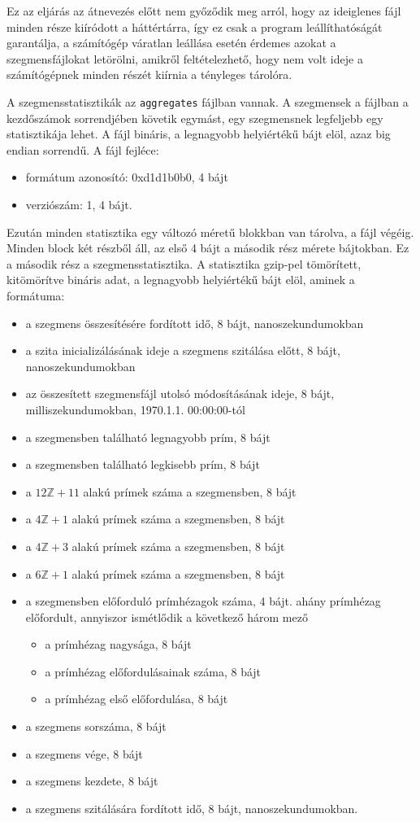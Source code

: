 Ez az eljárás az átnevezés előtt nem győződik meg arról, hogy az ideiglenes fájl minden része
kiíródott a háttértárra, így ez csak a program leállíthatóságát garantálja, a számítógép váratlan leállása esetén érdemes azokat a szegmensfájlokat letörölni, amikről feltételezhető, hogy nem volt ideje a számítógépnek minden részét kiírnia a tényleges tárolóra.

A szegmensstatisztikák az \texttt{aggregates} fájlban vannak.
A szegmensek a fájlban a kezdőszámok sorrendjében követik egymást, egy szegmensnek legfeljebb egy statisztikája lehet.
A fájl bináris, a legnagyobb helyiértékű bájt elöl, azaz big endian sorrendű. A fájl fejléce:
\begin{itemize}
\item formátum azonosító: 0xd1d1b0b0, 4 bájt
\item verziószám: 1, 4 bájt.
\end{itemize}
Ezután minden statisztika egy változó méretű blokkban van tárolva, a fájl végéig.
Minden block két részből áll, az első 4 bájt a második rész mérete bájtokban.
Ez a második rész a szegmensstatisztika.
A statisztika gzip-pel tömörített, kitömörítve bináris adat, a legnagyobb helyiértékű bájt elöl, aminek a formátuma:
\begin{itemize}
\item a szegmens összesítésére fordított idő, 8 bájt, nanoszekundumokban
\item a szita inicializálásának ideje a szegmens szitálása előtt, 8 bájt, nanoszekundumokban
\item az összesített szegmensfájl utolsó módosításának ideje, 8 bájt, milliszekundumokban, 1970.1.1. 00:00:00-tól
\item a szegmensben található legnagyobb prím, 8 bájt
\item a szegmensben található legkisebb prím, 8 bájt
\item a $12\mathbb{Z}+11$ alakú prímek száma a szegmensben, 8 bájt
\item a $4\mathbb{Z}+1$ alakú prímek száma a szegmensben, 8 bájt
\item a $4\mathbb{Z}+3$ alakú prímek száma a szegmensben, 8 bájt
\item a $6\mathbb{Z}+1$ alakú prímek száma a szegmensben, 8 bájt
\item a szegmensben előforduló prímhézagok száma, 4 bájt. ahány prímhézag előfordult, annyiszor ismétlődik a következő három mező
\begin{itemize}
\item a prímhézag nagysága, 8 bájt
\item a prímhézag előfordulásainak száma, 8 bájt
\item a prímhézag első előfordulása, 8 bájt
\end{itemize}
\item a szegmens sorszáma, 8 bájt
\item a szegmens vége, 8 bájt
\item a szegmens kezdete, 8 bájt
\item a szegmens szitálására fordított idő, 8 bájt, nanoszekundumokban.
\end{itemize}

